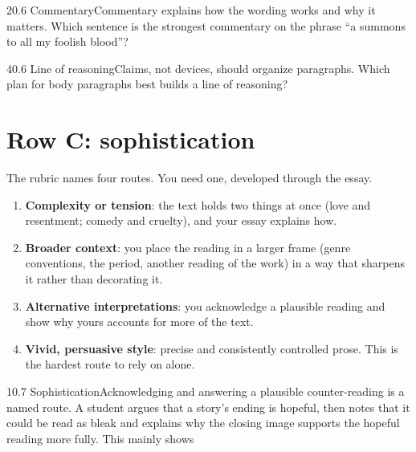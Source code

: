 \documentclass[11pt]{article}
\begin{document}
\begin{q}{2}{0.6 Commentary}{Commentary explains how the wording works and why it matters.}
Which sentence is the strongest commentary on the phrase ``a summons to all my foolish blood''?
\end{q}

\begin{q}{4}{0.6 Line of reasoning}{Claims, not devices, should organize paragraphs.}
Which plan for body paragraphs best builds a line of reasoning?
\end{q}

\section{Row C: sophistication}
\label{sec:7}

The rubric names four routes. You need one, developed through the essay.
\begin{enumerate}[leftmargin=1.6em]
\item \textbf{Complexity or tension}: the text holds two things at once (love and resentment; comedy and cruelty), and your essay explains how.
\item \textbf{Broader context}: you place the reading in a larger frame (genre conventions, the period, another reading of the work) in a way that sharpens it rather than decorating it.
\item \textbf{Alternative interpretations}: you acknowledge a plausible reading and show why yours accounts for more of the text.
\item \textbf{Vivid, persuasive style}: precise and consistently controlled prose. This is the hardest route to rely on alone.
\end{enumerate}

\begin{q}{1}{0.7 Sophistication}{Acknowledging and answering a plausible counter-reading is a named route.}
A student argues that a story's ending is hopeful, then notes that it could be read as bleak and explains why the closing image supports the hopeful reading more fully. This mainly shows
\end{q}
\end{document}
